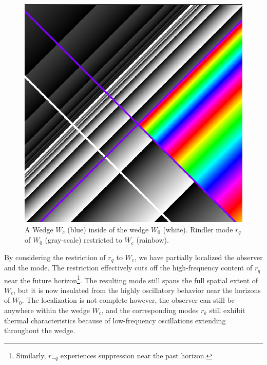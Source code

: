 \documentclass[12pt,a4paper]{article}
\begin{document}
\begin{figure}[h]
  \centering
\includegraphics[scale=0.4]{wedge_in_wedge.png}
\caption{A Wedge $W_c$ (blue) inside of the wedge $W_0$ (white). Rindler mode $r_q$ of $W_0$ (gray-scale) restricted to $W_c$ (rainbow).}
\label{restrict}
\end{figure}

By considering the restriction of $r_q$ to $W_c$, we have partially localized the observer and the mode. The restriction effectively cuts off the high-frequency content of $r_q$ near the future horizon\footnote{Similarly, $r_{-q}$ experiences suppression near the past horizon.}. The resulting mode still spans the full spatial extent of $W_c$, but it is now insulated from the highly oscillatory behavior near the horizons of $W_0$.  The localization is not complete however, the observer can still be anywhere within the wedge $W_c$, and the corresponding modes $r_k$ still exhibit thermal characteristics because of low-frequency oscillations extending throughout the wedge.
\end{document}
